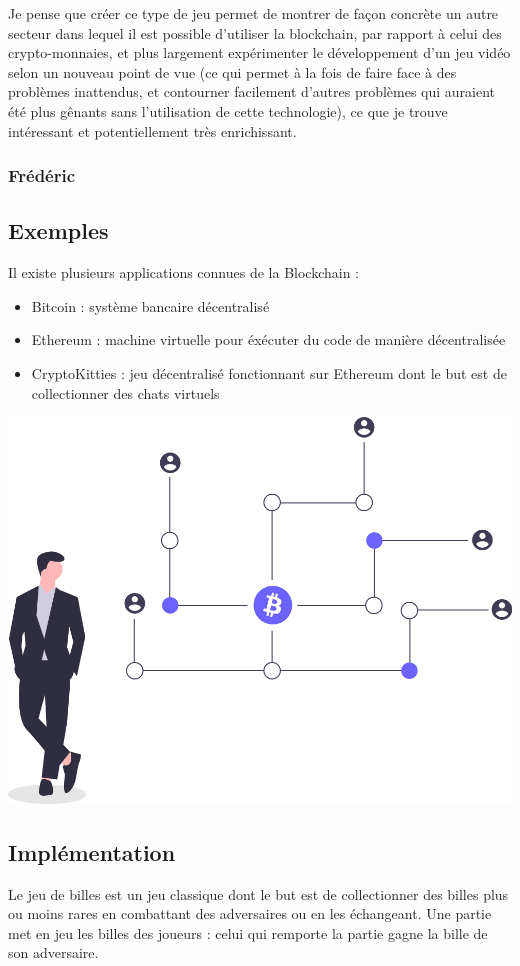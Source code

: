 \documentclass{article}
\begin{document}
Je pense que créer ce type de jeu permet de montrer de façon concrète un autre secteur dans lequel il est possible d'utiliser la blockchain, par rapport à celui des crypto-monnaies, et plus largement expérimenter le développement d'un jeu vidéo selon un nouveau point de vue (ce qui permet à la fois de faire face à des problèmes inattendus, et contourner facilement d'autres problèmes qui auraient été plus gênants sans l'utilisation de cette technologie), ce que je trouve intéressant et 
potentiellement très enrichissant.

\subsubsection{Frédéric}

\subsection{Exemples}

Il existe plusieurs applications connues de la Blockchain :
\begin{itemize}
    \item Bitcoin : système bancaire décentralisé
    \item Ethereum : machine virtuelle pour éxécuter du code de manière décentralisée
    \item CryptoKitties : jeu décentralisé fonctionnant sur Ethereum dont le but est de collectionner des chats virtuels
\end{itemize}

\includegraphics[width=0.3\linewidth]{assets/decentralized.png}\\

\subsection{Implémentation}

Le jeu de billes est un jeu classique dont le but est de collectionner des billes plus ou moins rares en combattant des adversaires ou en les échangeant. Une partie met en jeu les billes des joueurs : celui qui remporte la partie gagne la bille de son adversaire.
\end{document}
